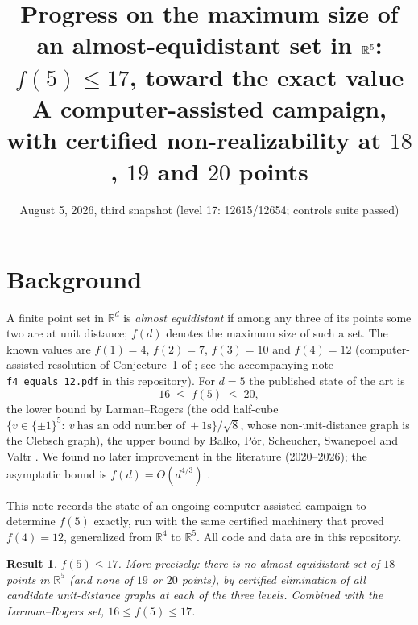 \documentclass[11pt]{article}
\title{\vspace{-1.2cm}Progress on the maximum size of an almost-equidistant
set in $\R^5$:\\ $f(5)\le 17$, toward the exact value\\[4pt]
\large A computer-assisted campaign, with certified non-realizability at
$18$, $19$ and $20$ points}
\author{}
\date{August 5, 2026, third snapshot (level 17: 12615/12654; controls suite passed)}
\newtheorem*{result}{Result}
\newcommand{\R}{\mathbb{R}}
\begin{document}
\maketitle
\vspace{-1.2cm}

\section*{Background}

A finite point set in $\R^d$ is \emph{almost equidistant} if among any three
of its points some two are at unit distance; $f(d)$ denotes the maximum size
of such a set. The known values are $f(1)=4$, $f(2)=7$, $f(3)=10$
\cite{Gyorey,BPSSV} and $f(4)=12$ (computer-assisted resolution of
Conjecture~1 of \cite{BPSSV}; see the accompanying note
\texttt{f4\_equals\_12.pdf} in this repository). For $d=5$ the published
state of the art is
\[
  16 \;\le\; f(5) \;\le\; 20,
\]
the lower bound by Larman--Rogers \cite{LR} (the odd half-cube
$\{v\in\{\pm1\}^5:\ v\ \text{has an odd number of}\ {+}1\text{s}\}/\sqrt8$,
whose non-unit-distance graph is the Clebsch graph), the upper bound by
Balko, P\'or, Scheucher, Swanepoel and Valtr \cite{BPSSV}. We found no
later improvement in the literature (2020--2026); the asymptotic bound is
$f(d)=O(d^{4/3})$ \cite{KMS}.

This note records the state of an ongoing computer-assisted campaign to
determine $f(5)$ exactly, run with the same certified machinery that proved
$f(4)=12$, generalized from $\R^4$ to $\R^5$. All code and data are in this
repository.

\begin{result}
$f(5) \le 17$. More precisely: there is no almost-equidistant set of $18$
points in $\R^5$ (and none of $19$ or $20$ points), by certified
elimination of all candidate unit-distance graphs at each of the three
levels. Combined with the Larman--Rogers set, $16 \le f(5) \le 17$.
\end{result}
\end{document}

